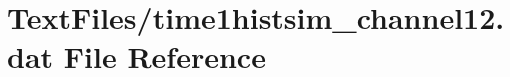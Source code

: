 \hypertarget{TextFiles_2time1histsim__channel12_8dat}{}\section{Text\+Files/time1histsim\+\_\+channel12.dat File Reference}
\label{TextFiles_2time1histsim__channel12_8dat}
